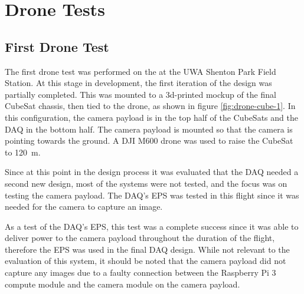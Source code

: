 \documentclass{report}
\begin{document}
\section{Drone Tests}
\subsection{First Drone Test}

The first drone test was performed on the  at the UWA Shenton Park Field Station. At this stage in development, the first iteration of the design was partially completed. This was mounted to a 3d-printed mockup of the final CubeSat chassis, then tied to the drone, as shown in figure \ref{fig:drone-cube-1}. In this configuration, the camera payload is in the top half of the CubeSats and the DAQ in the bottom half. The camera payload is mounted so that the camera is pointing towards the ground. A DJI M600 drone was used to raise the CubeSat to \SI{120}{\metre}.

Since at this point in the design process it was evaluated that the DAQ needed a second new design, most of the systems were not tested, and the focus was on testing the camera payload. The DAQ's EPS was tested in this flight since it was needed for the camera to capture an image.

As a test of the DAQ's EPS, this test was a complete success since it was able to deliver power to the camera payload throughout the duration of the flight, therefore the EPS was used in the final DAQ design. While not relevant to the evaluation of this system, it should be noted that the camera payload did not capture any images due to a faulty connection between the Raspberry Pi 3 compute module and the camera module on the camera payload.
\end{document}
